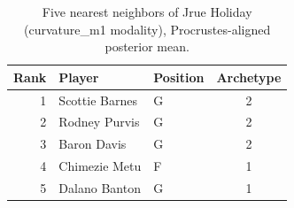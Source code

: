 \begin{table}[htbp]
  \centering\small
  \begin{tabular}{rllc}
    \toprule
    Rank & Player & Position & Archetype \\
    \midrule
    1 & Scottie Barnes & G & 2 \\
    2 & Rodney Purvis & G & 2 \\
    3 & Baron Davis & G & 2 \\
    4 & Chimezie Metu & F & 1 \\
    5 & Dalano Banton & G & 1 \\
    \bottomrule
  \end{tabular}
  \caption{Five nearest neighbors of Jrue Holiday (curvature_m1 modality), Procrustes-aligned posterior mean.}
  \label{tab:Jrue_Holiday_neighbors_curvature_m1}
\end{table}

